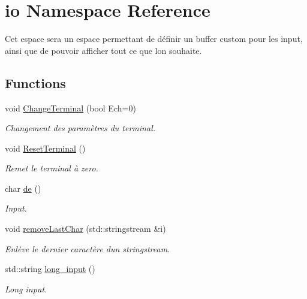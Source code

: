 \hypertarget{namespaceio}{}\section{io Namespace Reference}
\label{namespaceio}


Cet espace sera un espace permettant de définir un buffer custom pour les input, ainsi que de pouvoir afficher tout ce que l\textquotesingle{}on souhaite.  


\subsection*{Functions}
\begin{DoxyCompactItemize}
\item 
void \hyperlink{namespaceio_ac0223d0ecfee82d8cc86543604173b73}{Change\+Terminal} (bool Ech=0)
\begin{DoxyCompactList}\small\item\em Changement des paramètres du terminal. \end{DoxyCompactList}\item 
\mbox{\label{namespaceio_a44a79937063c75bdcd8f042d5f55d501}} 
void \hyperlink{namespaceio_a44a79937063c75bdcd8f042d5f55d501}{Reset\+Terminal} ()
\begin{DoxyCompactList}\small\item\em Remet le terminal à zero. \end{DoxyCompactList}\item 
char \hyperlink{namespaceio_ae9908b55f26f07e78043d7cfad003d22}{de} ()
\begin{DoxyCompactList}\small\item\em Input. \end{DoxyCompactList}\item 
void \hyperlink{namespaceio_a0ed486192687092d372440a79c3a65a3}{remove\+Last\+Char} (std\+::stringstream \&i)
\begin{DoxyCompactList}\small\item\em Enlève le dernier caractère d\textquotesingle{}un stringstream. \end{DoxyCompactList}\item 
std\+::string \hyperlink{namespaceio_ab044be3afd7ac04eeb1a496af0f1d5c6}{long\+\_\+input} ()
\begin{DoxyCompactList}\small\item\em Long input. \end{DoxyCompactList}\item 

\end{DoxyCompactItemize}

